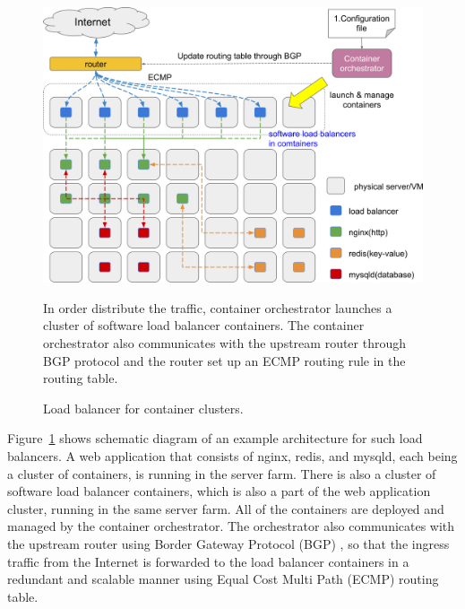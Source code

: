 \begin{figure}[h]
\begin{center}
\includegraphics[width=0.9\columnwidth]{Figs/cluster_of_container_loadbalancer}
\end{center}
\caption{
Load balancer for container clusters.
}
\centering\parbox[c]{0.9\columnwidth}{
In order distribute the traffic, container orchestrator launches a cluster of software load balancer containers. 
The container orchestrator also communicates with the upstream router through BGP protocol and the router set up an ECMP routing rule in the routing table.
}
\label{fig:cluster_of_container_loadbalancer}
\end{figure}

Figure~\ref{fig:cluster_of_container_loadbalancer} shows schematic diagram of an example architecture for such load balancers.
A web application that consists of nginx, redis, and mysqld, each being a cluster of containers, is running in the server farm.
There is also a cluster of software load balancer containers, which is also a part of the web application cluster, running in the same server farm. 
All of the containers are deployed and managed by the container orchestrator.
The orchestrator also communicates with the upstream router using Border Gateway Protocol (BGP) \cite{rfc7911}, so that the ingress traffic from the Internet is forwarded to the  load balancer containers in a redundant and scalable manner  using Equal Cost Multi Path (ECMP) \cite{al2008scalable} routing table.


